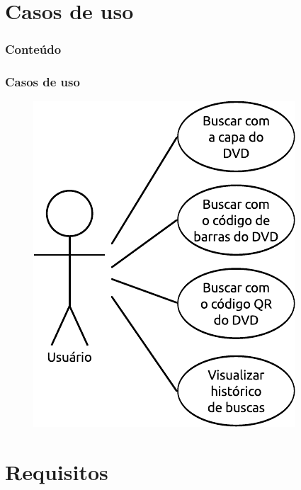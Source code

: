 \documentclass[14pt,beamer]{beamer}
\begin{document}
\section{Casos de uso}

\begin{frame}
	\frametitle{Conteúdo}
    \begin{multicols}{2}
        \small
    \end{multicols}
\end{frame}

\begin{frame}
	\frametitle{Casos de uso}
    
    \vspace{-5px}
    \begin{figure}
        \centering
        \includegraphics[scale=1]{imagens/caso1.pdf}
    \end{figure}
\end{frame}

\section{Requisitos}
\end{document}
